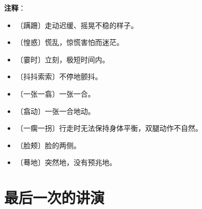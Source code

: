 \documentclass[12pt,UTF-8,openany]{ctexbook}
\begin{document}
\newpage

\textbf{注释}：

\vspace{-1em}

\begin{itemize}
    \setlength\itemsep{-0.2em}
    \item 〔蹒跚〕走动迟缓、摇晃不稳的样子。
    \item 〔惶惑〕慌乱，惊慌害怕而迷茫。
    \item 〔霎时〕立刻，极短时间内。
    \item 〔抖抖索索〕不停地颤抖。
    \item 〔一张一翕〕一张一合。
    \item 〔翕动〕一张一合地动。
    \item 〔一瘸一拐〕行走时无法保持身体平衡，双腿动作不自然。
    \item 〔脸颊〕脸的两侧。
    \item 〔蓦地〕突然地，没有预兆地。
\end{itemize}

\chapter{最后一次的讲演}
\end{document}
